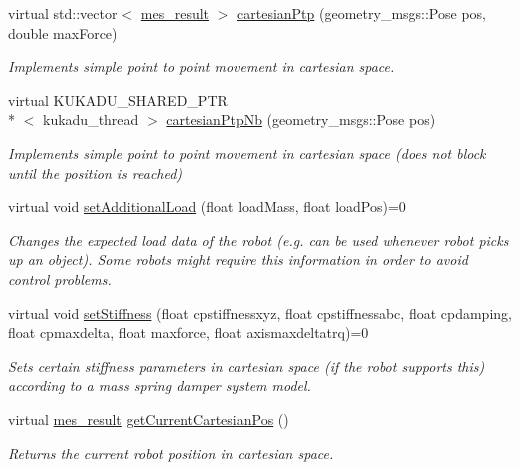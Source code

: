 \begin{DoxyCompactItemize}
virtual std\-::vector$<$ \hyperlink{structmes__result}{mes\-\_\-result} $>$ \hyperlink{classkukadu_1_1ControlQueue_a58518838c503e7eaa9c220bdf34ddd33}{cartesian\-Ptp} (geometry\-\_\-msgs\-::\-Pose pos, double max\-Force)
\begin{DoxyCompactList}\small\item\em Implements simple point to point movement in cartesian space. \end{DoxyCompactList}\item 
virtual K\-U\-K\-A\-D\-U\-\_\-\-S\-H\-A\-R\-E\-D\-\_\-\-P\-T\-R\\*
$<$ kukadu\-\_\-thread $>$ \hyperlink{classkukadu_1_1ControlQueue_a1c0ad5ad4d3af98f26d0c633181df010}{cartesian\-Ptp\-Nb} (geometry\-\_\-msgs\-::\-Pose pos)
\begin{DoxyCompactList}\small\item\em Implements simple point to point movement in cartesian space (does not block until the position is reached) \end{DoxyCompactList}\item 
virtual void \hyperlink{classkukadu_1_1ControlQueue_a18e628686b8c86abfdbd097b60aa5768}{set\-Additional\-Load} (float load\-Mass, float load\-Pos)=0
\begin{DoxyCompactList}\small\item\em Changes the expected load data of the robot (e.\-g. can be used whenever robot picks up an object). Some robots might require this information in order to avoid control problems. \end{DoxyCompactList}\item 
virtual void \hyperlink{classkukadu_1_1ControlQueue_aee25e6410909af34d740edbece98d677}{set\-Stiffness} (float cpstiffnessxyz, float cpstiffnessabc, float cpdamping, float cpmaxdelta, float maxforce, float axismaxdeltatrq)=0
\begin{DoxyCompactList}\small\item\em Sets certain stiffness parameters in cartesian space (if the robot supports this) according to a mass spring damper system model. \end{DoxyCompactList}\item 
virtual \hyperlink{structmes__result}{mes\-\_\-result} \hyperlink{classkukadu_1_1ControlQueue_abddacca2f9bf2db7a42a80d347843cec}{get\-Current\-Cartesian\-Pos} ()
\begin{DoxyCompactList}\small\item\em Returns the current robot position in cartesian space. \end{DoxyCompactList}\item 

\end{DoxyCompactItemize}
